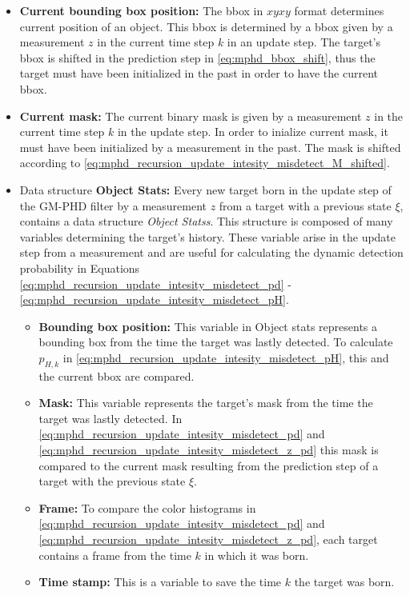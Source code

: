 \begin{itemize}
  \item \textbf{Current bounding box position:} The bbox in $xyxy$ format determines current position of an object.
  This bbox is determined by a bbox given by a measurement $z$ in the current time step $k$ in an update step. The
  target's
  bbox is shifted in the prediction step in \eqref{eq:mphd_bbox_shift}, thus the target must have been initialized in
  the
  past in order to have the current bbox.
  \item \textbf{Current mask:} The current binary mask is given by a measurement $z$ in the current time step $k$ in
  the update
  step. In order to inialize current mask, it must have been initialized by a measurement in
  the past. The mask is shifted according to \eqref{eq:mphd_recursion_update_intesity_misdetect_M_shifted}.
  \item Data structure \textbf{Object Stats:} Every new target born in the update step of the GM-PHD filter by a
  measurement $z$ from a target with a previous state $\xi$, contains a data structure \textit{Object Statss}. This
  structure is composed of many variables determining the target's history. These variable arise in the update step from
  a measurement and are useful for calculating the dynamic detection probability in Equations
  \eqref{eq:mphd_recursion_update_intesity_misdetect_pd} - \eqref{eq:mphd_recursion_update_intesity_misdetect_pH}.
      \begin{itemize}
        \item \textbf{Bounding box position:} This variable in Object stats represents a bounding box from the time
        the target was lastly detected. To calculate $p_{H,k}$ in
        \eqref{eq:mphd_recursion_update_intesity_misdetect_pH}, this and the current bbox are compared.
        \item \textbf{Mask:} This variable represents the target's mask from the time the target was lastly detected. In \eqref{eq:mphd_recursion_update_intesity_misdetect_pd} and \eqref{eq:mphd_recursion_update_intesity_misdetect_z_pd} this mask is compared to the current mask
        resulting from the prediction step of a target with the previous state $\xi$.
        \item \textbf{Frame:} To compare the color histograms in \eqref{eq:mphd_recursion_update_intesity_misdetect_pd}
        and \eqref{eq:mphd_recursion_update_intesity_misdetect_z_pd}, each target contains a frame from the time $k$
        in which
        it was born.
        \item \textbf{Time stamp:} This is a variable to save the time $k$ the target was born.

\end{itemize}
\end{itemize}
